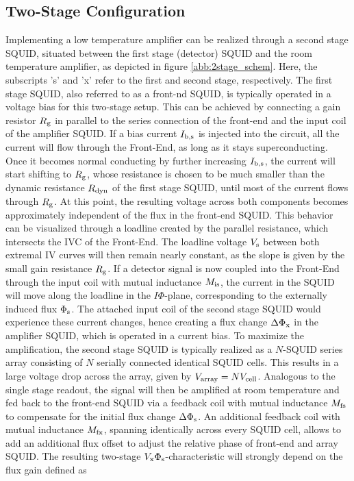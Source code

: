 \subsection{Two-Stage Configuration}\label{subsec_2stage_theo}

Implementing a low temperature amplifier can be realized through a second stage SQUID, situated between the first stage (detector) SQUID and the room temperature amplifier, as depicted in figure \ref{abb:2stage_schem}. Here, the subscripts 's' and 'x' refer to the first and second stage, respectively. The first stage SQUID, also referred to as a front-nd SQUID, is typically operated in a voltage bias for this two-stage setup. This can be achieved by connecting a gain resistor $R_{\rm g}$ in parallel to the series connection of the front-end and the input coil of the amplifier SQUID. If a bias current $I_{\rm b,s}$ is injected into the circuit, all the current will flow through the Front-End, as long as it stays superconducting. Once it becomes normal conducting by further increasing $I_{\rm b,s}$, the current will start shifting to $R_{\rm g}$, whose resistance is chosen to be much smaller than the dynamic resistance $R_{\rm dyn}$ of the first stage SQUID, until most of the current flows through $R_{\rm g}$. At this point, the resulting voltage across both components becomes approximately independent of the flux in the front-end SQUID. This behavior can be visualized through a loadline created by the parallel resistance, which intersects the IVC of the Front-End. The loadline voltage $V_{\rm s}$ between both extremal IV curves will then remain nearly constant, as the slope is given by the small gain resistance $R_{\rm g}$. If a detector signal is now coupled into the Front-End through the input coil with mutual inductance $M_{\rm is}$, the current in the SQUID will move along the loadline in the $I\Phi$-plane, corresponding to the externally induced flux $\Phi_{\rm s}$. The attached input coil of the second stage SQUID would experience these current changes, hence creating a flux change $\Delta\Phi_{\rm x}$ in the amplifier SQUID, which is operated in a current bias. To maximize the amplification, the second stage SQUID is typically realized as a $N$-SQUID series array consisting of $N$ serially connected identical SQUID cells. This results in a large voltage drop across the array, given by $V_{\rm array}=NV_{\rm cell}$. Analogous to the single stage readout, the signal will then be amplified at room temperature and fed back to the front-end SQUID via a feedback coil with mutual inductance $M_{\rm fs}$ to compensate for the initial flux change $\Delta\Phi_{\rm s}$. An additional feedback coil with mutual inductance $M_{\rm fx}$, spanning identically across every SQUID cell, 
allows to add an additional flux offset to adjust the relative phase of front-end and array SQUID.
The resulting two-stage $V_{\rm x}\Phi_{\rm s}$-characteristic will strongly depend on the flux gain defined as

